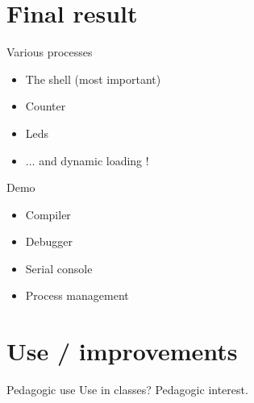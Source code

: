 \documentclass{beamer}
\begin{document}
  \section{Final result}
 
  \begin{frame}{Various processes}
      \begin{itemize}
        \item The shell (most important)
        \item Counter
        \item Leds
        \item ... and dynamic loading !
      \end{itemize}
  \end{frame}

  \begin{frame}{Demo}
    \begin{itemize}
      \item Compiler
      \item Debugger
      \item Serial console
      \item Process management
    \end{itemize}
  \end{frame}

  \section{Use / improvements}

  \begin{frame}{Pedagogic use}
      Use in classes? Pedagogic interest.
  \end{frame}
\end{document}

